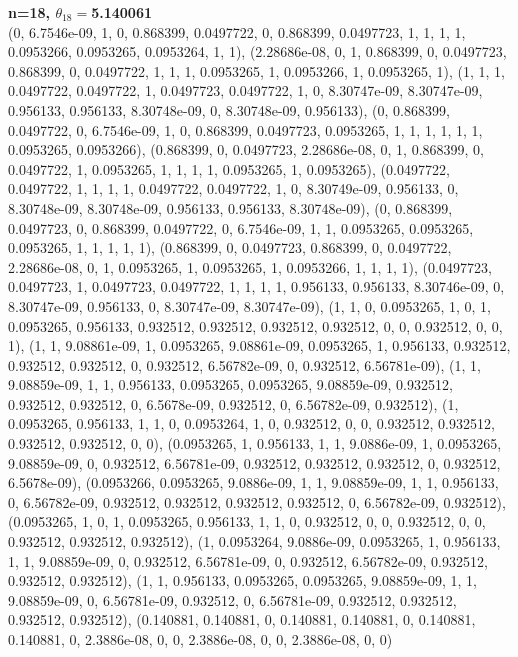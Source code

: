 \documentclass[12pt, a4paper]{extarticle}
\begin{document}
\begin{center}
{\bf\boldmath n=18, $\theta_{18}=$5.140061}\\
(0, 6.7546e-09, 1, 0, 0.868399, 0.0497722, 0, 0.868399, 0.0497723, 1, 1, 1, 1, 0.0953266, 0.0953265, 0.0953264, 1, 1),
(2.28686e-08, 0, 1, 0.868399, 0, 0.0497723, 0.868399, 0, 0.0497722, 1, 1, 1, 0.0953265, 1, 0.0953266, 1, 0.0953265, 1),
(1, 1, 1, 0.0497722, 0.0497722, 1, 0.0497723, 0.0497722, 1, 0, 8.30747e-09, 8.30747e-09, 0.956133, 0.956133, 8.30748e-09, 0, 8.30748e-09, 0.956133),
(0, 0.868399, 0.0497722, 0, 6.7546e-09, 1, 0, 0.868399, 0.0497723, 0.0953265, 1, 1, 1, 1, 1, 1, 0.0953265, 0.0953266),
(0.868399, 0, 0.0497723, 2.28686e-08, 0, 1, 0.868399, 0, 0.0497722, 1, 0.0953265, 1, 1, 1, 1, 0.0953265, 1, 0.0953265),
(0.0497722, 0.0497722, 1, 1, 1, 1, 0.0497722, 0.0497722, 1, 0, 8.30749e-09, 0.956133, 0, 8.30748e-09, 8.30748e-09, 0.956133, 0.956133, 8.30748e-09),
(0, 0.868399, 0.0497723, 0, 0.868399, 0.0497722, 0, 6.7546e-09, 1, 1, 0.0953265, 0.0953265, 0.0953265, 1, 1, 1, 1, 1),
(0.868399, 0, 0.0497723, 0.868399, 0, 0.0497722, 2.28686e-08, 0, 1, 0.0953265, 1, 0.0953265, 1, 0.0953266, 1, 1, 1, 1),
(0.0497723, 0.0497723, 1, 0.0497723, 0.0497722, 1, 1, 1, 1, 0.956133, 0.956133, 8.30746e-09, 0, 8.30747e-09, 0.956133, 0, 8.30747e-09, 8.30747e-09),
(1, 1, 0, 0.0953265, 1, 0, 1, 0.0953265, 0.956133, 0.932512, 0.932512, 0.932512, 0.932512, 0, 0, 0.932512, 0, 0, 1),
(1, 1, 9.08861e-09, 1, 0.0953265, 9.08861e-09, 0.0953265, 1, 0.956133, 0.932512, 0.932512, 0.932512, 0, 0.932512, 6.56782e-09, 0, 0.932512, 6.56781e-09),
(1, 1, 9.08859e-09, 1, 1, 0.956133, 0.0953265, 0.0953265, 9.08859e-09, 0.932512, 0.932512, 0.932512, 0, 6.5678e-09, 0.932512, 0, 6.56782e-09, 0.932512),
(1, 0.0953265, 0.956133, 1, 1, 0, 0.0953264, 1, 0, 0.932512, 0, 0, 0.932512, 0.932512, 0.932512, 0.932512, 0, 0),
(0.0953265, 1, 0.956133, 1, 1, 9.0886e-09, 1, 0.0953265, 9.08859e-09, 0, 0.932512, 6.56781e-09, 0.932512, 0.932512, 0.932512, 0, 0.932512, 6.5678e-09),
(0.0953266, 0.0953265, 9.0886e-09, 1, 1, 9.08859e-09, 1, 1, 0.956133, 0, 6.56782e-09, 0.932512, 0.932512, 0.932512, 0.932512, 0, 6.56782e-09, 0.932512),
(0.0953265, 1, 0, 1, 0.0953265, 0.956133, 1, 1, 0, 0.932512, 0, 0, 0.932512, 0, 0, 0.932512, 0.932512, 0.932512),
(1, 0.0953264, 9.0886e-09, 0.0953265, 1, 0.956133, 1, 1, 9.08859e-09, 0, 0.932512, 6.56781e-09, 0, 0.932512, 6.56782e-09, 0.932512, 0.932512, 0.932512),
(1, 1, 0.956133, 0.0953265, 0.0953265, 9.08859e-09, 1, 1, 9.08859e-09, 0, 6.56781e-09, 0.932512, 0, 6.56781e-09, 0.932512, 0.932512, 0.932512, 0.932512),
(0.140881, 0.140881, 0, 0.140881, 0.140881, 0, 0.140881, 0.140881, 0, 2.3886e-08, 0, 0, 2.3886e-08, 0, 0, 2.3886e-08, 0, 0)


\end{center}
\end{document}
